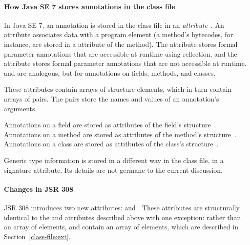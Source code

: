\documentclass[10pt]{article}
\begin{document}
\paragraph{How Java SE 7 stores annotations in the class file}


In Java SE 7, an annotation is stored in the class file in an
\emph{attribute}~\cite{JSR175,LindholmY99:CFF5}.  An attribute 
associates data with a program element (a
method's bytecodes, for instance, are stored in a 
attribute of the method). The \RuntimeVisibleParameterAnnotations attribute
stores formal parameter annotations that are accessible at runtime using
reflection, and the
\RuntimeInvisibleParameterAnnotations attribute stores formal parameter annotations
that are not accessible at runtime.
\RuntimeVisibleAnnotations and 
\RuntimeInvisibleAnnotations are analogous, but for annotations on fields,
methods, and classes.

These attributes contain arrays of
 structure elements, which in turn contain arrays of
 pairs.  The  pairs store
the names and values of an annotation's arguments.

Annotations on a field are stored as attributes of the field's 
 structure~\cite[\S 4.6]{LindholmY99:CFF5}.
Annotations on a method are stored as attributes of the method's
 structure~\cite[\S 4.7]{LindholmY99:CFF5}.
Annotations on a class are stored as attributes of the class's
 structure~\cite[\S 4.2]{LindholmY99:CFF5}.

Generic type information is stored in a different way in the class file, in
a signature attribute.  Its details are not germane to the current
discussion.


\paragraph{Changes in JSR 308}
JSR 308 introduces two new attributes:
\RuntimeVisibleTypeAnnotations and
\RuntimeInvisibleTypeAnnotations. These attributes are
structurally identical to the \RuntimeVisibleAnnotations and
\RuntimeInvisibleAnnotations attributes described above with one
exception: rather than an array of  elements,
\RuntimeVisibleTypeAnnotations and
\RuntimeInvisibleTypeAnnotations contain an array of
\extendedannotation elements, which are described in
Section~\ref{class-file:ext}.
\end{document}
